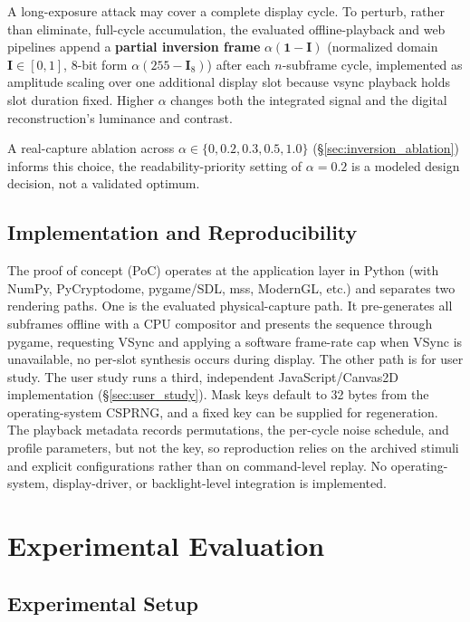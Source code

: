 \documentclass{ieeeaccess}
\begin{document}
A long-exposure attack may cover a complete display cycle. To perturb, rather than eliminate, full-cycle accumulation, the evaluated offline-playback and web pipelines append a \textbf{partial inversion frame} $\alpha(\mathbf{1}-\mathbf{I})$ (normalized domain $\mathbf{I}\in[0,1]$, 8-bit form $\alpha(255-\mathbf{I}_{8})$) after each $n$-subframe cycle, implemented as amplitude scaling over one additional display slot because vsync playback holds slot duration fixed. Higher $\alpha$ changes both the integrated signal and the digital reconstruction's luminance and contrast.

A real-capture ablation across $\alpha\in\{0, 0.2, 0.3, 0.5, 1.0\}$ (\S\ref{sec:inversion_ablation}) informs this choice, the readability-priority setting of $\alpha=0.2$ is a modeled design decision, not a validated optimum.

\subsection{Implementation and Reproducibility}

The proof of concept (PoC) operates at the application layer in Python (with NumPy, PyCryptodome, pygame/SDL, mss, ModernGL, etc.) and separates two rendering paths. One is the evaluated physical-capture path. It pre-generates all subframes offline with a CPU compositor and presents the sequence through pygame, requesting VSync and applying a software frame-rate cap when VSync is unavailable, no per-slot synthesis occurs during display. The other path is for user study. The user study runs a third, independent JavaScript/Canvas2D implementation (\S\ref{sec:user_study}). Mask keys default to 32 bytes from the operating-system CSPRNG, and a fixed key can be supplied for regeneration. The playback metadata records permutations, the per-cycle noise schedule, and profile parameters, but not the key, so reproduction relies on the archived stimuli and explicit configurations rather than on command-level replay. No operating-system, display-driver, or backlight-level integration is implemented.


\section{Experimental Evaluation}
\label{sec:evaluation}

\subsection{Experimental Setup}
\label{sec:setup}
\end{document}
